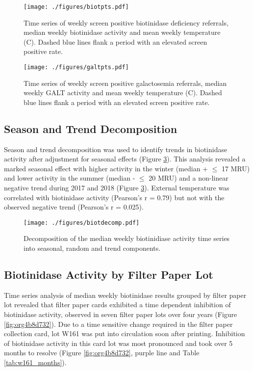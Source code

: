 \documentclass[review]{elsarticle}
\begin{document}
\begin{figure}[htbp]
\centering
\texttt{[image: ./figures/biotpts.pdf]}
\caption{\label{fig:orgecc3e4e}Time series of weekly screen positive biotinidase deficiency referrals, median weekly biotinidase activity and mean weekly temperature (\degree{}C). Dashed blue lines flank a period with an elevated screen positive rate.}
\end{figure}

\begin{figure}[htbp]
\centering
\texttt{[image: ./figures/galtpts.pdf]}
\caption{\label{fig:org71aed48}Time series of weekly screen positive galactosemia referrals, median weekly GALT activity and mean weekly temperature (\degree{}C).  Dashed blue lines flank a period with an elevated screen positive rate.}
\end{figure}

\clearpage

\subsection*{Season and Trend Decomposition}
\label{sec:orgc3a93fb}
Season and trend decomposition was used to identify trends in
biotinidase activity after adjustment for seasonal effects (Figure
\ref{fig:org7ca1bae}). This analysis revealed a marked seasonal effect with
higher activity in the winter (median + \(\le\) 17 MRU) and lower activity
in the summer (median - \(\le\) 20 MRU) and a non-linear negative trend
during 2017 and 2018 (Figure \ref{fig:org7ca1bae}). External temperature was
correlated with biotinidase activity (Pearson's r = 0.79) but not with
the observed negative trend (Pearson's r = 0.025).

\begin{figure}[htbp]
\centering
\texttt{[image: ./figures/biotdecomp.pdf]}
\caption{\label{fig:org7ca1bae}Decomposition of the median weekly biotinidiase activity time series into seasonal, random and trend components.}
\end{figure}

\clearpage

\subsection*{Biotinidase Activity by Filter Paper Lot}
\label{sec:org39c2e18}
Time series analysis of median weekly biotinidase results grouped by
filter paper lot revealed that filter paper cards exhibited a time
dependent inhibition of biotinidase activity, observed in seven filter
paper lots over four years (Figure \ref{fig:org4b8d732}). Due to a time sensitive
change required in the filter paper collection card, lot W161 was put into
circulation soon after printing. Inhibition of biotinidase activity in
this card lot was most pronounced and took over 5 months to resolve
(Figure \ref{fig:org4b8d732}, purple line and Table \ref{tab:w161_months}).
\end{document}
